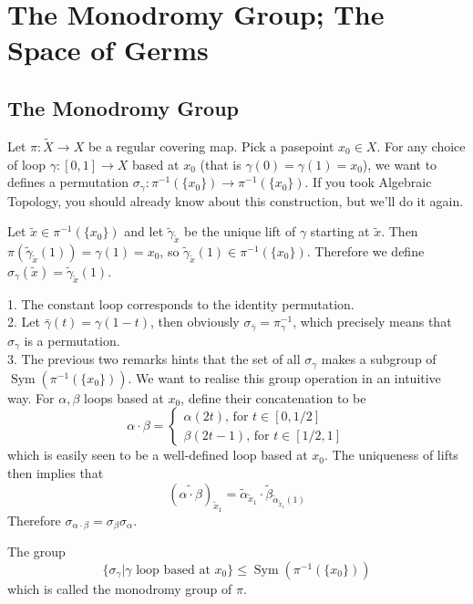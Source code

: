 \section{The Monodromy Group; The Space of Germs}
\subsection{The Monodromy Group}
Let $\pi:\tilde{X}\to X$ be a regular covering map.
Pick a pasepoint $x_0\in X$.
For any choice of loop $\gamma:[0,1]\to X$ based at $x_0$ (that is $\gamma(0)=\gamma(1)=x_0$), we want to defines a permutation $\sigma_\gamma:\pi^{-1}(\{x_0\})\to\pi^{-1}(\{x_0\})$.
If you took Algebraic Topology, you should already know about this construction, but we'll do it again.
\begin{definition}
    Let $\tilde{x}\in\pi^{-1}(\{x_0\})$ and let $\tilde{\gamma}_{\tilde{x}}$ be the unique lift of $\gamma$ starting at $\tilde{x}$.
    Then $\pi(\tilde{\gamma}_{\tilde{x}}(1))=\gamma(1)=x_0$, so $\tilde{\gamma}_{\tilde{x}}(1)\in\pi^{-1}(\{x_0\})$.
    Therefore we define $\sigma_\gamma(\tilde{x})=\tilde{\gamma}_{\tilde{x}}(1)$.
\end{definition}
\begin{remark}
    1. The constant loop corresponds to the identity permutation.\\
    2. Let $\bar\gamma(t)=\gamma(1-t)$, then obviously $\sigma_{\bar\gamma}=\pi_{\gamma}^{-1}$, which precisely means that $\sigma_\gamma$ is a permutation.\\
    3. The previous two remarks hints that the set of all $\sigma_\gamma$ makes a subgroup of $\operatorname{Sym}(\pi^{-1}(\{x_0\}))$.
    We want to realise this group operation in an intuitive way.
    For $\alpha,\beta$ loops based at $x_0$, define their concatenation to be
    $$\alpha\cdot\beta=\begin{cases}
        \alpha(2t)\text{, for $t\in[0,1/2]$}\\
        \beta(2t-1)\text{, for $t\in[1/2,1]$}
    \end{cases}$$
    which is easily seen to be a well-defined loop based at $x_0$.
    The uniqueness of lifts then implies that
    $$(\widetilde{\alpha\cdot\beta})_{\tilde{x}_1}=\tilde{\alpha}_{\tilde{x}_1}\cdot\tilde{\beta}_{\tilde{\alpha}_{\tilde{x}_1}(1)}$$
    Therefore $\sigma_{\alpha\cdot\beta}=\sigma_\beta\sigma_\alpha$.
\end{remark}
\begin{definition}
    The group
    $$\{\sigma_\gamma|\gamma\text{ loop based at $x_0$}\}\le \operatorname{Sym}(\pi^{-1}(\{x_0\}))$$
    which is called the monodromy group of $\pi$.
\end{definition}
